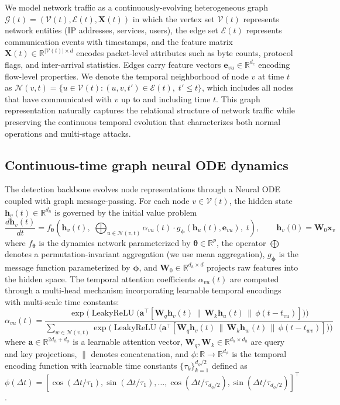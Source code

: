 \documentclass[preprint,review,12pt]{elsarticle}
\newcommand{\vx}{\mathbf{x}}            %
\newcommand{\vh}{\mathbf{h}}            %
\newcommand{\vW}{\mathbf{W}}            %
\newcommand{\vX}{\mathbf{X}}            %
\newcommand{\ve}{\mathbf{e}}            %
\newcommand{\vtheta}{\boldsymbol{\theta}} %
\newcommand{\vphi}{\boldsymbol{\phi}}     %
\newcommand{\R}{\mathbb{R}}
\newcommand{\calG}{\mathcal{G}}
\newcommand{\calN}{\mathcal{N}}
\newcommand{\calV}{\mathcal{V}}
\newcommand{\calE}{\mathcal{E}}
\DeclareMathOperator{\LeakyReLU}{LeakyReLU}
\begin{document}
We model network traffic as a continuously-evolving heterogeneous graph $\calG(t) = (\calV(t), \calE(t), \vX(t))$ in which the vertex set $\calV(t)$ represents network entities (IP addresses, services, users), the edge set $\calE(t)$ represents communication events with timestamps, and the feature matrix $\vX(t) \in \R^{|\calV(t)| \times d}$ encodes packet-level attributes such as byte counts, protocol flags, and inter-arrival statistics. Edges carry feature vectors $\ve_{vu} \in \R^{d_e}$ encoding flow-level properties. We denote the temporal neighborhood of node $v$ at time $t$ as $\calN(v, t) = \{u \in \calV(t) : (u, v, t') \in \calE(t),\; t' \leq t\}$, which includes all nodes that have communicated with $v$ up to and including time $t$. This graph representation naturally captures the relational structure of network traffic while preserving the continuous temporal evolution that characterizes both normal operations and multi-stage attacks.

\subsection{Continuous-time graph neural ODE dynamics}
\label{subsec:ct_dynamics}

The detection backbone evolves node representations through a Neural ODE coupled with graph message-passing. For each node $v \in \calV(t)$, the hidden state $\vh_v(t) \in \R^{d_h}$ is governed by the initial value problem
\begin{equation}\label{eq:node_ode}
    \frac{d\vh_v(t)}{dt} = f_{\vtheta}\!\left(\vh_v(t),\; \bigoplus_{u \in \calN(v,t)} \alpha_{vu}(t) \cdot g_{\vphi}(\vh_u(t), \ve_{vu}),\; t\right), \qquad \vh_v(0) = \vW_0 \vx_v
\end{equation}
where $f_{\vtheta}$ is the dynamics network parameterized by $\vtheta \in \R^p$, the operator $\bigoplus$ denotes a permutation-invariant aggregation (we use mean aggregation), $g_{\vphi}$ is the message function parameterized by $\vphi$, and $\vW_0 \in \R^{d_h \times d}$ projects raw features into the hidden space. The temporal attention coefficients $\alpha_{vu}(t)$ are computed through a multi-head mechanism incorporating learnable temporal encodings with multi-scale time constants:
\begin{equation}\label{eq:attention}
    \alpha_{vu}(t) = \frac{\exp\!\Big(\LeakyReLU\!\big(\mathbf{a}^{\!\top}[\vW_q \vh_v(t) \,\|\, \vW_k \vh_u(t) \,\|\, \phi(t - t_{vu})]\big)\Big)}{\displaystyle\sum_{w \in \calN(v,t)} \exp\!\Big(\LeakyReLU\!\big(\mathbf{a}^{\!\top}[\vW_q \vh_v(t) \,\|\, \vW_k \vh_w(t) \,\|\, \phi(t - t_{wv})]\big)\Big)}
\end{equation}
where $\mathbf{a} \in \R^{2d_h + d_\phi}$ is a learnable attention vector, $\vW_q, \vW_k \in \R^{d_h \times d_h}$ are query and key projections, $\|$ denotes concatenation, and $\phi: \R \to \R^{d_\phi}$ is the temporal encoding function with learnable time constants $\{\tau_k\}_{k=1}^{d_\phi/2}$ defined as $\phi(\Delta t) = [\cos(\Delta t / \tau_1), \sin(\Delta t / \tau_1), \ldots, \cos(\Delta t / \tau_{d_\phi/2}), \sin(\Delta t / \tau_{d_\phi/2})]^\top$.
\end{document}
